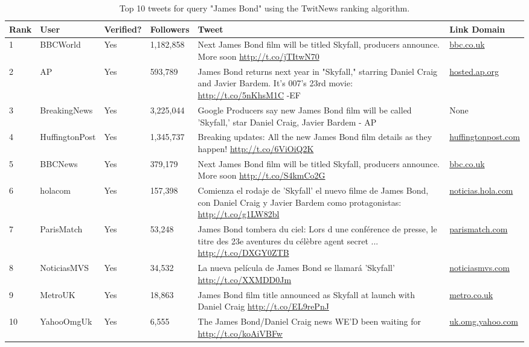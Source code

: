 \documentclass[10pt]{proc}
\begin{document}
    \begin{table*}
      \begin{tabular}{| l | l | l | l | p{6.5cm} | p{2cm} |}
        \hline
        Rank & User & Verified? & Followers & Tweet & Link Domain \\
        \hline
        1 & BBCWorld & Yes & 1,182,858 & Next James Bond film will be titled Skyfall, producers announce. More soon \url{http://t.co/jTItwN70} & \url{bbc.co.uk} \\
        \hline
        2 & AP & Yes & 593,789 & James Bond returns next year in "Skyfall," starring Daniel Craig and Javier Bardem. It's 007's 23rd movie: \url{http://t.co/5nKhsM1C} -EF & \url{hosted.ap.org} \\
        \hline
        3 & BreakingNews & Yes & 3,225,044 & Google Producers say new James Bond film will be called 'Skyfall,' star Daniel Craig, Javier Bardem - AP & None \\
        \hline
        4 & HuffingtonPost & Yes & 1,345,737 & Breaking updates: All the new James Bond film details as they happen! \url{http://t.co/6ViOiQ2K} & \url{huffingtonpost.com} \\
        \hline
        5 & BBCNews & Yes & 379,179 & Next James Bond film will be titled Skyfall, producers announce. More soon \url{http://t.co/S4kmCo2G} & \url{bbc.co.uk} \\
        \hline
        6 & holacom & Yes & 157,398 & Comienza el rodaje de 'Skyfall' el nuevo filme de James Bond, con Daniel Craig y Javier Bardem como protagonistas: \url{http://t.co/g1LW82bl} & \url{noticias.hola.com} \\
        \hline
        7 & ParisMatch & Yes & 53,248 & James Bond tombera du ciel: Lors d une conférence de presse, le titre des 23e aventures du célèbre agent secret ... \url{http://t.co/DXGY0ZTB} & \url{parismatch.com} \\
        \hline
        8 & NoticiasMVS & Yes & 34,532 & La nueva película de James Bond se llamará 'Skyfall' \url{http://t.co/XXMDD0Jm} & \url{noticiasmvs.com} \\
        \hline
        9 & MetroUK & Yes & 18,863 & James Bond film title announced as Skyfall at launch with Daniel Craig \url{http://t.co/EL9rePnJ} & \url{metro.co.uk} \\
        \hline
        10 & YahooOmgUk & Yes & 6,555 & The James Bond/Daniel Craig news WE'D been waiting for \url{http://t.co/koAiVBFw} & \url{uk.omg.yahoo.com} \\
        \hline
      \end{tabular}
      \caption{Top 10 tweets for query "James Bond" using the TwitNews ranking algorithm.}
      \label{BondRanking}      
    \end{table*}
    
\end{document}
